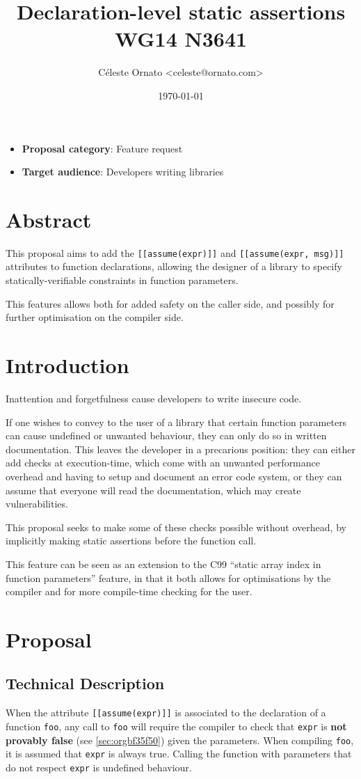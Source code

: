 \documentclass[a4paper, 12pt]{article}
\author{Céleste Ornato <celeste@ornato.com>}
\date{\today}
\title{Declaration-level static assertions\\\medskip
\large WG14 N3641}
\begin{document}
\maketitle
\begin{itemize}
\item \textbf{Proposal category}: Feature request
\item \textbf{Target audience}: Developers writing libraries
\end{itemize}
\section{Abstract}
\label{sec:orgb265026}
This proposal aims to add the \texttt{[[assume(expr)]]} and \texttt{[[assume(expr, msg)]]}
attributes to function declarations, allowing the designer of a library to specify
statically-verifiable constraints in function parameters.

This features allows both for added safety on the caller side, and possibly for
further optimisation on the compiler side.
\section{Introduction}
\label{sec:orgcc98c2c}
Inattention and forgetfulness cause developers to write insecure code.

If one wishes to convey to the user of a library that certain function parameters
can cause undefined or unwanted behaviour, they can only do so in written
documentation.  This leaves the developer in a precarious position: they can
either add checks at execution-time, which come with an unwanted performance
overhead and having to setup and document an error code system,
or they can assume that everyone will read the documentation, which may create
vulnerabilities.

This proposal seeks to make some of these checks possible without overhead, by implicitly
making static assertions before the function call.

This feature can be seen as an extension to the C99 ``static array index in
function parameters'' feature, in that it both allows for optimisations by the
compiler and for more compile-time checking for the user.
\section{Proposal}
\label{sec:org3848b2e}
\subsection{Technical Description}
\label{sec:org08b1199}
When the attribute \texttt{[[assume(expr)]]} is associated to the declaration of a
function \texttt{foo}, any call to \texttt{foo} will require the compiler to check that \texttt{expr}
is \textbf{not provably false} (see \ref{sec:orgbf35f50}) given the parameters.
When compiling \texttt{foo}, it is assumed that \texttt{expr} is always true.  Calling the
function with parameters that do not respect \texttt{expr} is undefined behaviour.
\end{document}
